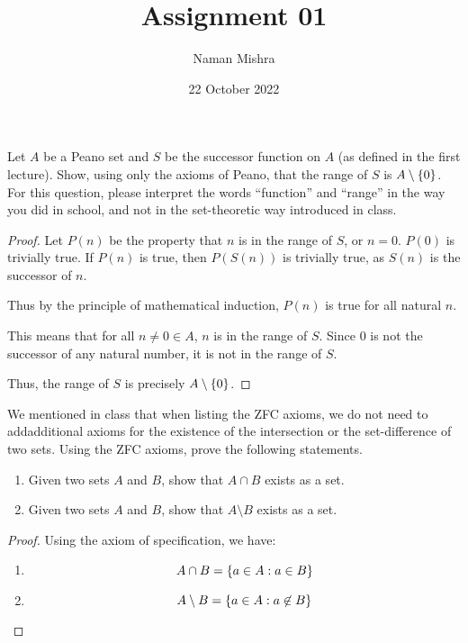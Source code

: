 \documentclass[12pt]{article}
\title{Assignment 01}
\author{Naman Mishra}
\date{22 October 2022}
\begin{document}
\maketitle

\begin{problem} \label{prob:peano:successor_range}
    Let $A$ be a Peano set and $S$ be the successor function on $A$ (as defined in the first lecture).
    Show, using only the axioms of Peano, that the range of $S$ is $A \setminus \set{0}$.
    For this question, please interpret the words ``function'' and ``range'' in the way you did in school, and not in the set-theoretic way introduced in class.
\end{problem}
\begin{proof}
    Let $P(n)$ be the property that $n$ is in the range of $S$, or $n = 0$.
    $P(0)$ is trivially true.
    If $P(n)$ is true, then $P(S(n))$ is trivially true, as $S(n)$ is the successor of $n$.

    Thus by the principle of mathematical induction, $P(n)$ is true for all natural $n$.
    
    This means that for all $n \neq 0 \in A$, $n$ is in the range of $S$.
    Since $0$ is not the successor of any natural number, it is not in the range of $S$.

    Thus, the range of $S$ is precisely $A \setminus \set{0}$.
\end{proof}

\begin{problem} \label{prob:zfc:intersection_and_difference}
    We mentioned in class that when listing the ZFC axioms, we do not need to addadditional axioms for the existence of the intersection or the set-difference of two sets.
    Using the ZFC axioms, prove the following statements.
    \begin{enumerate}[label=(\alph*)]
        \item Given two sets $A$ and $B$, show that $A \cap B$ exists as a set.
        \item Given two sets $A$ and $B$, show that $A \setminus B$ exists as a set.
    \end{enumerate}
\end{problem}

\begin{proof}
    Using the axiom of specification, we have:
    \begin{enumerate}[label=(\alph*)]
        \item \[
            A \cap B = \set{a \in A : a \in B}
        \]
        \item \[
            A \setminus B = \set{a \in A : a \not\in B} \qedhere
        \]
    \end{enumerate}
\end{proof}
\end{document}
